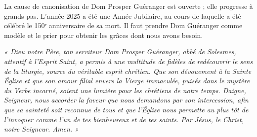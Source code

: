 \documentclass[Session2026.tex]{subfiles}
\begin{document}
La cause de canonisation de Dom Prosper Guéranger est ouverte ; elle progresse à grands pas.
L’année 2025 a été une Année Jubilaire, au cours de laquelle a été célébré le 150ᵉ anniversaire de sa
mort. Il faut prendre Dom Guéranger comme modèle et le prier pour obtenir les grâces dont nous
avons besoin.

\vfill

\emph{« Dieu notre Père, ton serviteur Dom Prosper Guéranger, abbé de Solesmes, attentif à l’Esprit Saint, a permis à une multitude de fidèles de redécouvrir le sens de la liturgie, source du véritable esprit chrétien. Que son dévouement à la Sainte Église et que son amour filial envers la Vierge immaculée, puisés dans le mystère du Verbe incarné, soient une lumière pour les chrétiens de notre temps. Daigne, Seigneur, nous accorder la faveur que nous demandons par son intercession, afin que sa sainteté soit reconnue de tous et que l’Église nous permette au plus tôt de l’invoquer comme l’un de tes bienheureux et de tes saints. Par Jésus, le Christ, notre Seigneur. Amen. »}

\pagebreak
\end{document}
